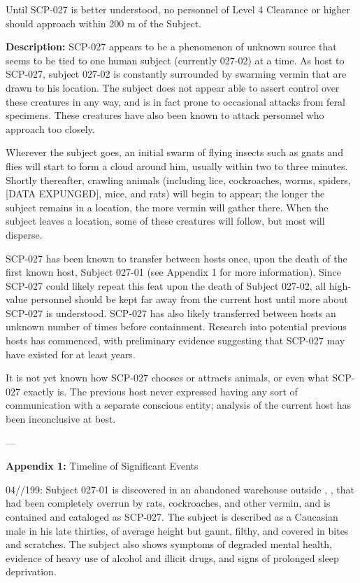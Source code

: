 Until SCP-027 is better understood, no personnel of Level 4 Clearance or higher should approach within 200 m of the Subject.

\textbf{Description:} SCP-027 appears to be a phenomenon of unknown source that seems to be tied to one human subject (currently 027-02) at a time. As host to SCP-027, subject 027-02 is constantly surrounded by swarming vermin that are drawn to his location. The subject does not appear able to assert control over these creatures in any way, and is in fact prone to occasional attacks from feral specimens. These creatures have also been known to attack personnel who approach too closely.

Wherever the subject goes, an initial swarm of flying insects such as gnats and flies will start to form a cloud around him, usually within two to three minutes. Shortly thereafter, crawling animals (including lice, cockroaches, worms, spiders, [DATA EXPUNGED], mice, and rats) will begin to appear; the longer the subject remains in a location, the more vermin will gather there. When the subject leaves a location, some of these creatures will follow, but most will disperse.

SCP-027 has been known to transfer between hosts once, upon the death of the first known host, Subject 027-01 (see Appendix 1 for more information). Since SCP-027 could likely repeat this feat upon the death of Subject 027-02, all high-value personnel should be kept far away from the current host until more about SCP-027 is understood. SCP-027 has also likely transferred between hosts an unknown number of times before containment. Research into potential previous hosts has commenced, with preliminary evidence suggesting that SCP-027 may have existed for at least  years.

It is not yet known how SCP-027 chooses or attracts animals, or even what SCP-027 exactly is. The previous host never expressed having any sort of communication with a separate conscious entity; analysis of the current host has been inconclusive at best.

---

\textbf{Appendix 1:} Timeline of Significant Events

04//199: Subject 027-01 is discovered in an abandoned warehouse outside , , that had been completely overrun by rats, cockroaches, and other vermin, and is contained and cataloged as SCP-027. The subject is described as a Caucasian male in his late thirties, of average height but gaunt, filthy, and covered in bites and scratches. The subject also shows symptoms of degraded mental health, evidence of heavy use of alcohol and illicit drugs, and signs of prolonged sleep deprivation.

